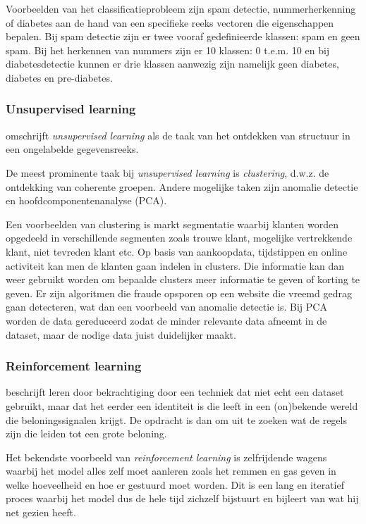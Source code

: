 Voorbeelden van het classificatieprobleem zijn spam detectie, nummerherkenning of diabetes aan de hand van een specifieke reeks vectoren die eigenschappen bepalen. Bij spam detectie zijn er twee vooraf gedefinieerde klassen: spam en geen spam. Bij het herkennen van nummers zijn er 10 klassen: 0 t.e.m. 10 en bij diabetesdetectie kunnen er drie klassen aanwezig zijn namelijk geen diabetes, diabetes en pre-diabetes.

\subsubsection{Unsupervised learning}
\textcite{Lievens2021} omschrijft \textit{unsupervised learning} als de taak van het ontdekken van structuur in een ongelabelde gegevensreeks.

De meest prominente taak bij \textit{unsupervised learning} is \textit{clustering}, d.w.z. de ontdekking van coherente
groepen. Andere mogelijke taken zijn anomalie detectie en hoofdcomponentenanalyse (PCA).

Een voorbeelden van clustering is markt segmentatie waarbij klanten worden opgedeeld in verschillende segmenten zoals trouwe klant, mogelijke vertrekkende klant, niet tevreden klant etc. Op basis van aankoopdata, tijdstippen en online activiteit kan men de klanten gaan indelen in clusters. Die informatie kan dan weer gebruikt worden om bepaalde clusters meer informatie te geven of korting te geven.
Er zijn algoritmen die fraude opsporen op een website die vreemd gedrag gaan detecteren, wat dan een voorbeeld van anomalie detectie is.
Bij PCA worden de data gereduceerd zodat de minder relevante data afneemt in de dataset, maar de nodige data juist duidelijker maakt.


\subsubsection{Reinforcement learning}
\textcite{Lievens2021} beschrijft leren door bekrachtiging door een techniek dat niet echt een dataset gebruikt, maar dat het eerder een identiteit is die leeft in een (on)bekende wereld die beloningssignalen krijgt. De opdracht is dan om uit te zoeken wat de regels zijn die leiden tot een grote beloning.

Het bekendste voorbeeld van \textit{reinforcement learning} is zelfrijdende wagens waarbij het model alles zelf moet aanleren zoals het remmen en gas geven in welke hoeveelheid en hoe er gestuurd moet worden. Dit is een lang en iteratief proces waarbij het model dus de hele tijd zichzelf bijstuurt en bijleert van wat hij net gezien heeft.

